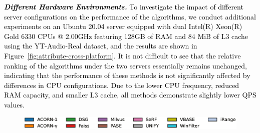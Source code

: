 \documentclass[sigconf, nonacm, pdfa]{acmart}
\begin{document}
{	\textit{\textbf{\textcolor{black}{Different Hardware Environments.}}} 
	\textcolor{black}{To investigate the impact of different server configurations on the performance of the algorithms, we conduct additional experiments on an Ubuntu 20.04 server equipped with dual Intel(R) Xeon(R) Gold 6330 CPUs @ 2.00GHz featuring 128GB of RAM and 84 MiB of L3 cache using the YT-Audio-Real dataset, and the results are shown in Figure~\ref{fig:attribute-cross-platform}. It is not difficult to see that the relative ranking of the algorithms under the two servers essentially remains unchanged, indicating that the performance of these methods is not significantly affected by differences in CPU configurations. Due to the lower CPU frequency, reduced RAM capacity, and smaller L3 cache, all methods demonstrate slightly lower QPS values.}

	



	\begin{figure}[t]
		\centering
		
		
		\hspace*{5pt}
		\includegraphics[width=0.98\columnwidth]{figures/indexData/rangeFilter_legend_only.png}
		
	
		

\end{figure}}
\end{document}
